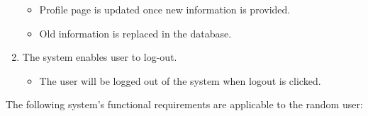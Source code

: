 \begin{enumerate}
		\begin{itemize}
			\item Profile page is updated once new information is provided. 
			\item Old information is replaced in the database. 
		\end{itemize}
	\item The system enables user to log-out.
	
		\begin{itemize}
			\item The user will be logged out of the system when logout is clicked.
		\end{itemize}
\end{enumerate}

The following system's functional requirements are applicable to the random user:

